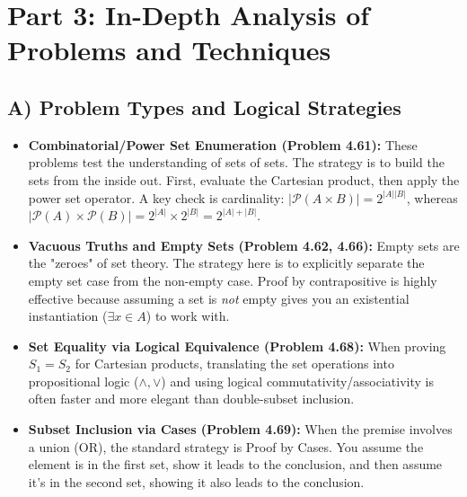 \documentclass[11pt]{article}
\newcommand{\powerset}{\mathcal{P}}
\begin{document}
\section{Part 3: In-Depth Analysis of Problems and Techniques}

\subsection{A) Problem Types and Logical Strategies}
\begin{itemize}
    \item \textbf{Combinatorial/Power Set Enumeration (Problem 4.61):} These problems test the understanding of sets of sets. The strategy is to build the sets from the inside out. First, evaluate the Cartesian product, then apply the power set operator. A key check is cardinality: $|\powerset(A \times B)| = 2^{|A||B|}$, whereas $|\powerset(A) \times \powerset(B)| = 2^{|A|} \times 2^{|B|} = 2^{|A|+|B|}$.
    \item \textbf{Vacuous Truths and Empty Sets (Problem 4.62, 4.66):} Empty sets are the "zeroes" of set theory. The strategy here is to explicitly separate the empty set case from the non-empty case. Proof by contrapositive is highly effective because assuming a set is \textit{not} empty gives you an existential instantiation ($\exists x \in A$) to work with.
    \item \textbf{Set Equality via Logical Equivalence (Problem 4.68):} When proving $S_1 = S_2$ for Cartesian products, translating the set operations into propositional logic ($\land, \lor$) and using logical commutativity/associativity is often faster and more elegant than double-subset inclusion.
    \item \textbf{Subset Inclusion via Cases (Problem 4.69):} When the premise involves a union (OR), the standard strategy is Proof by Cases. You assume the element is in the first set, show it leads to the conclusion, and then assume it's in the second set, showing it also leads to the conclusion.
\end{itemize}
\end{document}
